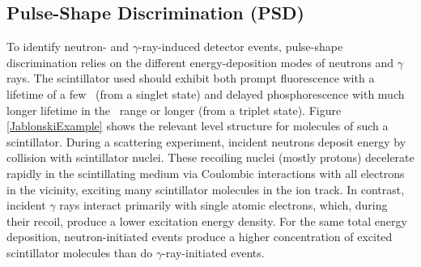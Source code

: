 \subsection{Pulse-Shape Discrimination (PSD)}
To identify neutron- and $\gamma$-ray-induced detector events, pulse-shape discrimination
relies on the different energy-deposition modes of neutrons and $\gamma$ rays.
The scintillator used should exhibit both prompt fluorescence with a
lifetime of a few \nano\second\ (from a singlet
state) and delayed phosphorescence with much longer lifetime in the
\micro\second\ range or longer (from a triplet state). Figure \ref{JablonskiExample} shows the
relevant level structure for molecules of such a scintillator. During a scattering experiment,
incident neutrons deposit energy by collision with scintillator nuclei.
These recoiling nuclei (mostly protons) decelerate rapidly in the scintillating
medium via Coulombic interactions with all electrons in the vicinity,
exciting many scintillator molecules in the
ion track. In contrast, incident $\gamma$ rays interact primarily with
single atomic electrons, which, during their recoil, produce a lower excitation energy density.
For the same total energy deposition,
neutron-initiated events produce a higher 
concentration of excited scintillator molecules than do $\gamma$-ray-initiated
events.

